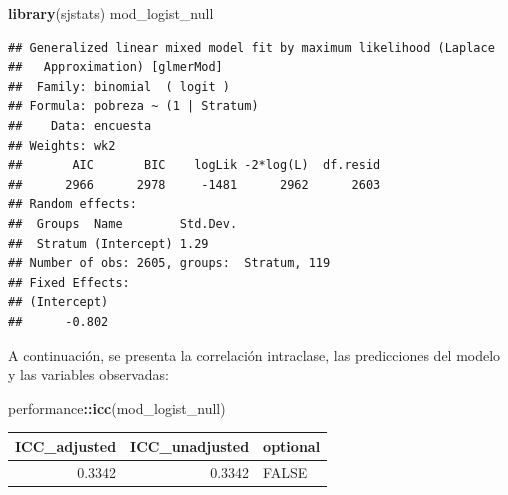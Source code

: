 \documentclass[
  12pt,
]{book}
\newenvironment{Shaded}{\begin{snugshade}}{\end{snugshade}}
\newcommand{\AttributeTok}[1]{\textcolor[rgb]{0.13,0.29,0.53}{#1}}
\newcommand{\CommentTok}[1]{\textcolor[rgb]{0.56,0.35,0.01}{\textit{#1}}}
\newcommand{\DataTypeTok}[1]{\textcolor[rgb]{0.13,0.29,0.53}{#1}}
\newcommand{\DecValTok}[1]{\textcolor[rgb]{0.00,0.00,0.81}{#1}}
\newcommand{\FunctionTok}[1]{\textcolor[rgb]{0.13,0.29,0.53}{\textbf{#1}}}
\newcommand{\NormalTok}[1]{#1}
\newcommand{\OtherTok}[1]{\textcolor[rgb]{0.56,0.35,0.01}{#1}}
\newcommand{\SpecialCharTok}[1]{\textcolor[rgb]{0.81,0.36,0.00}{\textbf{#1}}}
\newcommand{\StringTok}[1]{\textcolor[rgb]{0.31,0.60,0.02}{#1}}
\begin{document}
\begin{Shaded}
\begin{Highlighting}[]
\FunctionTok{library}\NormalTok{(sjstats)}
\NormalTok{mod\_logist\_null}
\end{Highlighting}
\end{Shaded}

\begin{verbatim}
## Generalized linear mixed model fit by maximum likelihood (Laplace
##   Approximation) [glmerMod]
##  Family: binomial  ( logit )
## Formula: pobreza ~ (1 | Stratum)
##    Data: encuesta
## Weights: wk2
##       AIC       BIC    logLik -2*log(L)  df.resid 
##      2966      2978     -1481      2962      2603 
## Random effects:
##  Groups  Name        Std.Dev.
##  Stratum (Intercept) 1.29    
## Number of obs: 2605, groups:  Stratum, 119
## Fixed Effects:
## (Intercept)  
##      -0.802
\end{verbatim}

A continuación, se presenta la correlación intraclase, las predicciones del modelo y las variables observadas:

\begin{Shaded}
\begin{Highlighting}[]
\NormalTok{performance}\SpecialCharTok{::}\FunctionTok{icc}\NormalTok{(mod\_logist\_null)}
\end{Highlighting}
\end{Shaded}

\begin{tabular}{r|r|l}
\hline
ICC\_adjusted & ICC\_unadjusted & optional\\
\hline
0.3342 & 0.3342 & FALSE\\
\hline
\end{tabular}

\begin{Shaded}
\end{Shaded}
\end{document}
